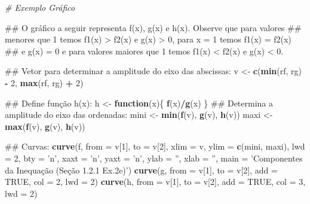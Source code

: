 \documentclass[]{book}
\newenvironment{Shaded}{\begin{snugshade}}{\end{snugshade}}
\newcommand{\KeywordTok}[1]{\textcolor[rgb]{0.13,0.29,0.53}{\textbf{#1}}}
\newcommand{\DataTypeTok}[1]{\textcolor[rgb]{0.13,0.29,0.53}{#1}}
\newcommand{\DecValTok}[1]{\textcolor[rgb]{0.00,0.00,0.81}{#1}}
\newcommand{\StringTok}[1]{\textcolor[rgb]{0.31,0.60,0.02}{#1}}
\newcommand{\CommentTok}[1]{\textcolor[rgb]{0.56,0.35,0.01}{\textit{#1}}}
\newcommand{\OtherTok}[1]{\textcolor[rgb]{0.56,0.35,0.01}{#1}}
\newcommand{\ControlFlowTok}[1]{\textcolor[rgb]{0.13,0.29,0.53}{\textbf{#1}}}
\newcommand{\OperatorTok}[1]{\textcolor[rgb]{0.81,0.36,0.00}{\textbf{#1}}}
\newcommand{\NormalTok}[1]{#1}
\begin{document}
\begin{enumerate}
\begin{Shaded}
\begin{Highlighting}[]
\CommentTok{# Exemplo Gráfico}

\NormalTok{##  O gráfico a seguir representa f(x), g(x) e h(x). Observe que para valores}
\NormalTok{## menores que 1 temos f1(x) > f2(x) e g(x) > 0, para x = 1 temos f1(x) = f2(x)}
\NormalTok{## e g(x) = 0 e para valores maiores que 1 temos f1(x) < f2(x) e g(x) < 0.}

\NormalTok{##  Vetor para determinar a amplitude do eixo das abscissas:}
\NormalTok{v <-}\StringTok{ }\KeywordTok{c}\NormalTok{(}\KeywordTok{min}\NormalTok{(rf, rg) }\OperatorTok{-}\StringTok{ }\DecValTok{2}\NormalTok{, }\KeywordTok{max}\NormalTok{(rf, rg) }\OperatorTok{+}\StringTok{ }\DecValTok{2}\NormalTok{)}

\NormalTok{##  Define função h(x):}
\NormalTok{h <-}\StringTok{ }\ControlFlowTok{function}\NormalTok{(x)\{}
  \KeywordTok{f}\NormalTok{(x)}\OperatorTok{/}\KeywordTok{g}\NormalTok{(x)}
\NormalTok{\}}
\NormalTok{##  Determina  a amplitude do eixo das ordenadas:}
\NormalTok{mini <-}\StringTok{ }\KeywordTok{min}\NormalTok{(}\KeywordTok{f}\NormalTok{(v), }\KeywordTok{g}\NormalTok{(v), }\KeywordTok{h}\NormalTok{(v))}
\NormalTok{maxi <-}\StringTok{ }\KeywordTok{max}\NormalTok{(}\KeywordTok{f}\NormalTok{(v), }\KeywordTok{g}\NormalTok{(v), }\KeywordTok{h}\NormalTok{(v))}

\NormalTok{##  Curvas:}
\KeywordTok{curve}\NormalTok{(f, }\DataTypeTok{from =}\NormalTok{ v[}\DecValTok{1}\NormalTok{], }\DataTypeTok{to =}\NormalTok{ v[}\DecValTok{2}\NormalTok{], }\DataTypeTok{xlim =}\NormalTok{ v, }\DataTypeTok{ylim =} \KeywordTok{c}\NormalTok{(mini, maxi), }\DataTypeTok{lwd =} \DecValTok{2}\NormalTok{,}
  \DataTypeTok{bty =} \StringTok{'n'}\NormalTok{, }\DataTypeTok{xaxt =} \StringTok{'n'}\NormalTok{, }\DataTypeTok{yaxt =} \StringTok{'n'}\NormalTok{, }\DataTypeTok{ylab =} \StringTok{''}\NormalTok{, }\DataTypeTok{xlab =} \StringTok{''}\NormalTok{,}
  \DataTypeTok{main =} \StringTok{'Componentes da Inequação (Seção 1.2.1 Ex.2e)'}\NormalTok{)}
\KeywordTok{curve}\NormalTok{(g, }\DataTypeTok{from =}\NormalTok{ v[}\DecValTok{1}\NormalTok{], }\DataTypeTok{to =}\NormalTok{ v[}\DecValTok{2}\NormalTok{], }\DataTypeTok{add =} \OtherTok{TRUE}\NormalTok{, }\DataTypeTok{col =} \DecValTok{2}\NormalTok{, }\DataTypeTok{lwd =} \DecValTok{2}\NormalTok{)}
\KeywordTok{curve}\NormalTok{(h, }\DataTypeTok{from =}\NormalTok{ v[}\DecValTok{1}\NormalTok{], }\DataTypeTok{to =}\NormalTok{ v[}\DecValTok{2}\NormalTok{], }\DataTypeTok{add =} \OtherTok{TRUE}\NormalTok{, }\DataTypeTok{col =} \DecValTok{3}\NormalTok{, }\DataTypeTok{lwd =} \DecValTok{2}\NormalTok{)}


\end{Highlighting}
\end{Shaded}
\end{enumerate}
\end{document}
